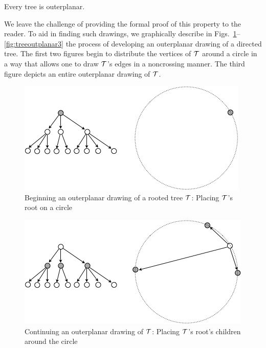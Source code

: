 \begin{prop}
\label{thm:trees-outerplanar}
Every tree is outerplanar.
\end{prop}

We leave the challenge of providing the formal proof of this property to the reader.  To aid in finding such drawings, we graphically describe in Figs.~\ref{fig:treeoutplanar1}--\ref{fig:treeoutplanar3} the process of developing an outerplanar drawing of a directed tree.  The first two figures begin to distribute the vertices of $\mbox{$\cal T$}$ around a circle in a way that allows one to draw $\mbox{$\cal T$}$'s edges in a noncrossing manner.  The third figure depicts an entire outerplanar drawing of $\mbox{$\cal T$}$.
\begin{figure}[hbt]
\begin{center}
       \includegraphics[scale=0.45]{FiguresGraph/TreeOutplanar1}
\caption{Beginning an outerplanar drawing of a rooted tree $\mbox{$\cal T$}$: Placing $\mbox{$\cal T$}$'s root on a circle}
  \label{fig:treeoutplanar1}
\end{center}
\end{figure}
\begin{figure}[hbt]
\begin{center}
       \includegraphics[scale=0.45]{FiguresGraph/TreeOutplanar2}
\caption{Continuing an outerplanar drawing of $\mbox{$\cal T$}$: Placing $\mbox{$\cal T$}$'s root's children around the circle}
  \label{fig:treeoutplanar2}
\end{center}
\end{figure}
